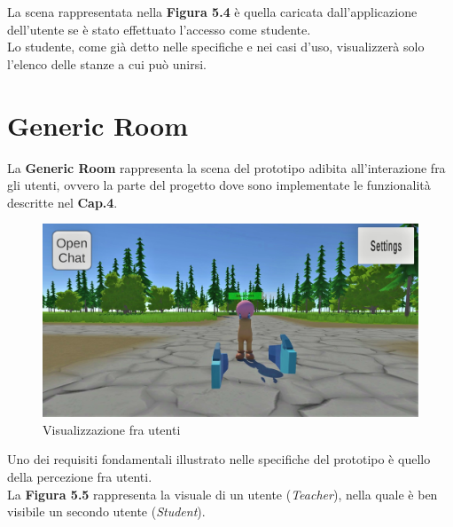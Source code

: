 \hspace{-0.6cm}La scena rappresentata nella \textbf{Figura 5.4} è quella caricata dall'applicazione dell'utente se è stato effettuato l'accesso come studente.
\\Lo studente, come già detto nelle specifiche e nei casi d'uso, visualizzerà solo l'elenco delle stanze a cui può unirsi.
\section{Generic Room}
La \textbf{Generic Room} rappresenta la scena del prototipo adibita all'interazione fra gli utenti, ovvero la parte del progetto dove sono implementate le funzionalità descritte nel \textbf{Cap.4}.
\begin{figure}[H]
\centering
\includegraphics[scale = 0.25]{Immagini/Dimostrazioni d'uso/civediamo.jpg}
\caption{Visualizzazione fra utenti}
\end{figure}
\hspace{-0.6cm}Uno dei requisiti fondamentali illustrato nelle specifiche del prototipo è quello della percezione fra utenti.
\\La \textbf{Figura 5.5} rappresenta la visuale di un utente (\textit{Teacher}), nella quale è ben visibile un secondo utente (\textit{Student}).
